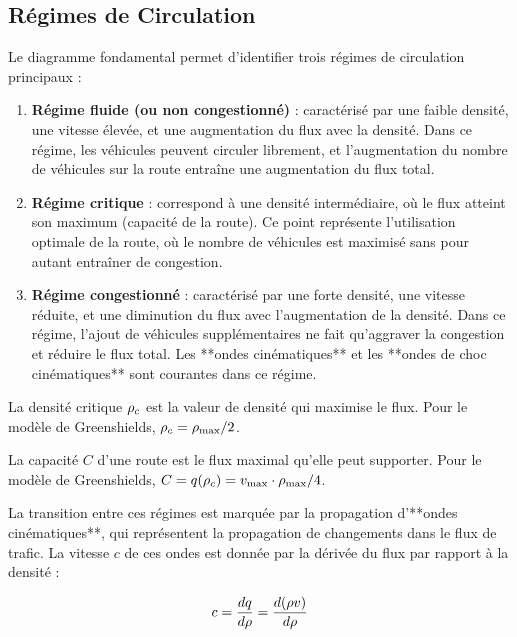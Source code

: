 \subsection{Régimes de Circulation}
\label{subsec:regimes}

Le diagramme fondamental permet d'identifier trois régimes de circulation principaux :

\begin{enumerate}
    \item \textbf{Régime fluide (ou non congestionné)} : caractérisé par une faible densité, une vitesse élevée, et une augmentation du flux avec la densité. Dans ce régime, les véhicules peuvent circuler librement, et l'augmentation du nombre de véhicules sur la route entraîne une augmentation du flux total.
    \item \textbf{Régime critique} : correspond à une densité intermédiaire, où le flux atteint son maximum (capacité de la route). Ce point représente l'utilisation optimale de la route, où le nombre de véhicules est maximisé sans pour autant entraîner de congestion.
    \item \textbf{Régime congestionné} : caractérisé par une forte densité, une vitesse réduite, et une diminution du flux avec l'augmentation de la densité. Dans ce régime, l'ajout de véhicules supplémentaires ne fait qu'aggraver la congestion et réduire le flux total. Les **ondes cinématiques** et les **ondes de choc cinématiques** sont courantes dans ce régime.
\end{enumerate}

\begin{definition}
La densité critique $\rho_c$ est la valeur de densité qui maximise le flux. Pour le modèle de Greenshields, $\rho_c = \rho_{\max}/2$.
\end{definition}

\begin{definition}
La capacité $C$ d'une route est le flux maximal qu'elle peut supporter. Pour le modèle de Greenshields, $C = q(\rho_c) = v_{\max} \cdot \rho_{\max}/4$.
\end{definition}

La transition entre ces régimes est marquée par la propagation d'**ondes cinématiques**, qui représentent la propagation de changements dans le flux de trafic. La vitesse $c$ de ces ondes est donnée par la dérivée du flux par rapport à la densité :

\begin{align}
c = \frac{dq}{d\rho} = \frac{d(\rho v)}{d\rho}
\label{eq:wave_speed}
\end{align}

